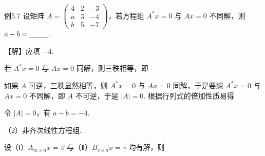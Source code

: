 \begin{fcard}{例5.7}
设矩阵 $A=\begin{pmatrix}4&2&-3\\a&3&-4\\b&5&-7\end{pmatrix}$，若方程组 $A^{*}x=0$ 与 $Ax=0$ 不同解，则 $a-b=\underline{\hspace{2.6em}}$.

【解】应填 $-4$.

若 $A^{*}x=0$ 与 $Ax=0$ 同解，则三秩相等，即


如果 $A$ 可逆，三秩显然相等，则 $A^{*}x=0$ 与 $Ax=0$ 同解，于是要想 $A^{*}x=0$ 与 $Ax=0$ 不同解，即 $A$ 不可逆，于是 $|A|=0$. 根据行列式的倍加性质易得


令 $|A|=0$，有 $a-b=-4$.
\end{fcard}

（2）非齐次线性方程组.


设（Ⅰ）$A_{m\times n}x=\beta$ 与（Ⅱ）$B_{s\times n}x=\gamma$ 均有解，则

